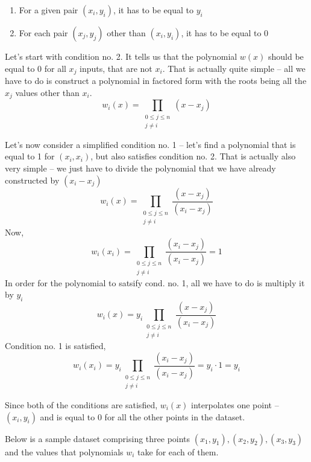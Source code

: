 \documentclass{MathematicaReport}
\begin{document}
\begin{enumerate}
	\item For a given pair \( (x_i, y_i) \), it has to be equal to \( y_i \) 
	\item For each pair \( (x_j, y_j) \) other than \( (x_i, y_i) \), it has to
	be equal to 0
\end{enumerate}

Let's start with condition no. 2. It tells us that the polynomial \( w(x) \)
should be equal to 0 for all \( x_j \) inputs, that are not \( x_i \). That is
actually quite simple -- all we have to do is construct a polynomial in
factored form with the roots being all the \( x_j \) values other than \( x_i \).
\[
	w_i(x) = \prod_{\begin{smallmatrix}0\le j\le n\\ j\neq i\end{smallmatrix}} (x-x_j)
\]

Let's now consider a simplified condition no. 1 -- let's find a polynomial that is
equal to 1 for \( (x_i, x_i) \), but also satisfies condition no. 2. That is
actually also very simple -- we just have to divide the polynomial that we have 
already constructed by \((x_i - x_j)\)
\[
	w_i(x) = \prod_{\begin{smallmatrix}0\le j\le n\\ j\neq i\end{smallmatrix}} \frac{(x - x_j)}{(x_i - x_j)}
\]
Now,
\[
	w_i(x_i) = \prod_{\begin{smallmatrix}0\le j\le n\\ j\neq i\end{smallmatrix}} \frac{(x_i - x_j)}{(x_i - x_j)} = 1
\]
In order for the polynomial to satsify cond. no. 1, all we have to do is 
multiply it by \( y_i \)
\[
	w_i(x) = y_i \prod_{\begin{smallmatrix}0\le j\le n\\ j\neq i\end{smallmatrix}} \frac{(x - x_j)}{(x_i - x_j)}
\]
Condition no. 1 is satisfied,
\[
	w_i(x_i) = y_i \prod_{\begin{smallmatrix}0\le j\le n\\ j\neq i\end{smallmatrix}} \frac{(x_i - x_j)}{(x_i - x_j)} = y_i \cdot 1 = y_i
\]

Since both of the conditions are satisfied, \( w_i(x) \) interpolates one point
-- \( (x_i, y_i) \) and is equal to 0 for all the other points in the dataset. 

Below is a sample dataset comprising three points 
\( (x_1, y_1), (x_2, y_2), (x_3, y_3) \) and the values that polynomials \(w_i\)
take for each of them.
\end{document}
